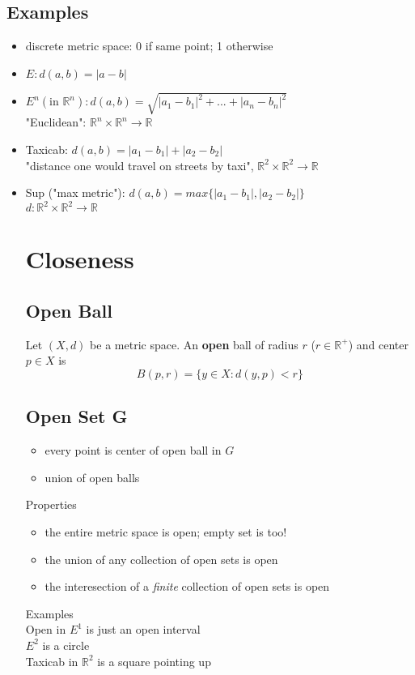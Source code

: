 \documentclass[12pt]{article}
\begin{document}
\subsection*{Examples}
\begin{itemize}
    \item discrete metric space: 0 if same point; 1 otherwise
    \item $E: d(a, b) = |a-b|$
    \item $E^n (\text{in } \mathbb{R}^n): d(a, b) = \sqrt{|a_1-b_1|^2 + ...+|a_n-b_n|^2}$\\
    "Euclidean": $\mathbb{R}^n \times \mathbb{R}^n \rightarrow \mathbb{R}$
    \item Taxicab: $d(a, b) = |a_1-b_1| + |a_2 - b_2|$\\
    "distance one would travel on streets by taxi", $\mathbb{R}^2 \times \mathbb{R}^2 \rightarrow \mathbb{R}$

    \item Sup ("max metric"): $d(a, b) = max\{|a_1 - b_1|, |a_2 - b_2|\}$ \\
    $d: \mathbb{R}^2 \times \mathbb{R}^2 \rightarrow \mathbb{R}$
\section*{Closeness}
\subsection*{Open Ball}
Let $(X, d)$ be a metric space. An \textbf{open} ball of radius $r$ ($r \in \mathbb{R}^+$) and center $p \in X$ is 
$$B(p, r) = \{ y \in X: d(y, p) < r\}$$

\subsection*{Open Set G}
\begin{framed}
\begin{itemize}
    \item every point is center of open ball in $G$
    \item union of open balls
\end{itemize}
\end{framed}


Properties
\begin{itemize}
    \item the entire metric space is open; empty set is too!
    \item the union of any collection of open sets is open
    \item the interesection of a \textit{finite} collection of open sets is open
\end{itemize}
\bigskip
Examples \\
Open in $E^1$ is just an open interval \\
$E^2$ is a circle \\
Taxicab in $\mathbb{R}^2$ is a square pointing up


\end{itemize}
\end{document}
